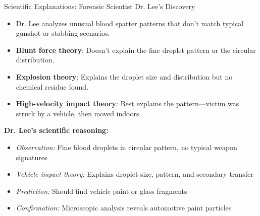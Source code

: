 \documentclass{beamer}
\begin{document}
\begin{frame}{Scientific Explanations: Forensic Scientist Dr. Lee's Discovery}
	\begin{itemize}
		\item Dr. Lee analyzes unusual blood spatter patterns that don't match typical gunshot or stabbing scenarios.
		\item \textbf{Blunt force theory}: Doesn't explain the fine droplet pattern or the circular distribution.
		\item \textbf{Explosion theory}: Explains the droplet size and distribution but no chemical residue found.
		\item \textbf{High-velocity impact theory}: Best explains the pattern—victim was struck by a vehicle, then moved indoors.
	\end{itemize}
	
	\begin{example}
		\scriptsize
		\textbf{Dr. Lee's scientific reasoning:}
		\begin{itemize}
			\item \textit{Observation:} Fine blood droplets in circular pattern, no typical weapon signatures
			\item \textit{Vehicle impact theory:} Explains droplet size, pattern, and secondary transfer
			\item \textit{Prediction:} Should find vehicle paint or glass fragments
			\item \textit{Confirmation:} Microscopic analysis reveals automotive paint particles
		\end{itemize}
	\end{example}
\end{frame}
\end{document}
